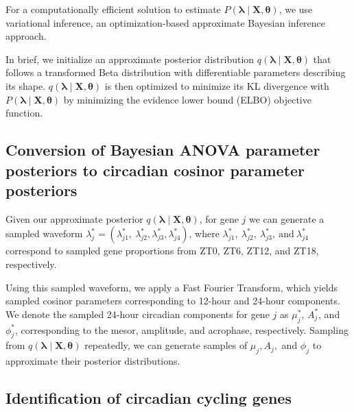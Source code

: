 \documentclass[12pt]{article}
\begin{document}
For a computationally efficient solution to estimate $P\!\left( \boldsymbol{\lambda} \mid
\mathbf{X}, \boldsymbol{\theta} \right)$, we use variational inference, an optimization-based
approximate Bayesian inference approach.

In brief, we initialize an approximate posterior distribution $q\!\left( \boldsymbol{\lambda} \mid
\mathbf{X}, \boldsymbol{\theta} \right)$ that follows a transformed Beta distribution with
differentiable parameters describing its shape. $q\!\left( \boldsymbol{\lambda} \mid \mathbf{X},
\boldsymbol{\theta} \right)$ is then optimized to minimize its KL divergence with $P\!\left(
\boldsymbol{\lambda} \mid \mathbf{X}, \boldsymbol{\theta} \right)$ by minimizing the evidence lower
bound (ELBO) objective function. 

\subsection*{Conversion of Bayesian ANOVA parameter posteriors to circadian cosinor parameter posteriors}

Given our approximate posterior $q\!\left( \boldsymbol{\lambda} \mid \mathbf{X}, \boldsymbol{\theta}
\right)$, for gene $j$ we can generate a sampled waveform $\lambda_{j}^{*} = \left(
\lambda_{j1}^{*},\ \lambda_{j2}^{*}, \lambda_{j3}^{*}, \lambda_{j4}^{*} \right)$, where
$\lambda_{j1}^{*},\ \lambda_{j2}^{*},\ \lambda_{j3}^{*},\ \text{and}\ \lambda_{j4}^{*}$ correspond
to sampled gene proportions from ZT0, ZT6, ZT12, and ZT18, respectively.

Using this sampled waveform, we apply a Fast Fourier Transform, which yields sampled cosinor
parameters corresponding to 12-hour and 24-hour components. We denote the sampled 24-hour circadian
components for gene $j$ as $\mu_{j}^{*}$, $A_{j}^{*}$, and $\phi_{j}^{*}$, corresponding to the
mesor, amplitude, and acrophase, respectively. Sampling from $q\!\left( \boldsymbol{\lambda} \mid
\mathbf{X}, \boldsymbol{\theta} \right)$ repeatedly, we can generate samples of $\mu_{j}, A_{j},$
and $\phi_{j}$ to approximate their posterior distributions.

\subsection*{Identification of circadian cycling genes}
\end{document}
